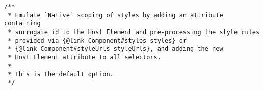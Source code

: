 \begin{verbatim}
/**
 * Emulate `Native` scoping of styles by adding an attribute containing
 * surrogate id to the Host Element and pre-processing the style rules
 * provided via {@link Component#styles styles} or
 * {@link Component#styleUrls styleUrls}, and adding the new
 * Host Element attribute to all selectors.
 *
 * This is the default option.
 */
\end{verbatim}
